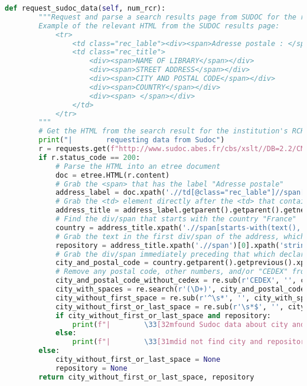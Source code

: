 \documentclass[class=article, crop=false]{standalone}
\begin{document}
\begin{lstlisting}[language=python, style=python]
    def request_sudoc_data(self, num_rcr):
        """Request and parse a search results page from SUDOC for the repository whose RCR number was found in the Unimarc 930B data.
        Example of the relevant HTML from the SUDOC results page:
            <tr>
                <td class="rec_lable"><div><span>Adresse postale : </span></div></td>
                <td class="rec_title">
                    <div><span>NAME OF LIBRARY</span></div>
                    <div><span>STREET ADDRESS</span></div>
                    <div><span>CITY AND POSTAL CODE</span></div>
                    <div><span>COUNTRY</span></div>
                    <div><span> </span></div>
                </td>
            </tr>
        """
        # Get the HTML from the search result for the institution's RCR number from Sudoc
        print("|        requesting data from Sudoc")
        r = requests.get(f"http://www.sudoc.abes.fr/cbs/xslt//DB=2.2/CMD?ACT=SRCHA&IKT=8888&SRT=RLV&TRM={num_rcr}")
        if r.status_code == 200:
            # Parse the HTML into an etree document
            doc = etree.HTML(r.content)
            # Grab the <span> that has the label "Adresse postale"
            address_label = doc.xpath('.//td[@class="rec_lable"]//span[contains(text(),"Adresse postale")]')[0]
            # Grab the <td> element directly after the <td> that contains the label "Adresse postale"
            address_title = address_label.getparent().getparent().getnext()
            # Find the div/span that starts with the country "France"
            country = address_title.xpath('.//span[starts-with(text(), "France")]')[0]
            # Grab the text in the first div/span of the address, which should be the name of the institution
            repository = address_title.xpath('.//span')[0].xpath('string()')
            # Grab the div/span immediately preceding that which declare the country, which should contain the City
            city_and_postal_code = country.getparent().getprevious().xpath('string()')
            # Remove any postal code, other numbers, and/or "CEDEX" from the repository and clean up spaces around remaining text
            city_and_postal_code_without_cedex = re.sub(r'CEDEX', '', city_and_postal_code)
            city_with_spaces = re.search(r'(\D+)', city_and_postal_code_without_cedex).group(0)
            city_without_first_space = re.sub(r'^\s*', '', city_with_spaces)
            city_without_first_or_last_space = re.sub(r'\s*$', '', city_without_first_space)
            if city_without_first_or_last_space and repository:
                print(f"|        \33[32mfound Sudoc data about city and repository\x1b[0m")
            else:
                print(f"|        \33[31mdid not find city and repository in Sudoc data\x1b[0m")
        else:
            city_without_first_or_last_space = None
            repository = None
        return city_without_first_or_last_space, repository


\end{lstlisting}
\end{document}
